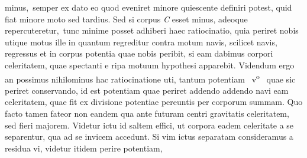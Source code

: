 %
\protect{}minus\lbrack,\rbrack\ semper ex
%
%
dato eo quod eveniret minore quiescente definiri potest, quid fiat
minore moto sed tardius. Sed si corpus \textit{C} esset minus, adeoque repercuteretur\lbrack,\rbrack\
tunc minime posset adhiberi haec ratiocinatio, quia periret nobis
utique motus ille in quantum regreditur contra motum navis, scilicet
%
%
navis,%
\protect{}
%
%
regressus 
%
%
et in corpus
%
%
%
potentia\protect{} quae
nobis peribit, si eam dabimus corpori
%
%
celeritatem, quae spectanti e %
ripa\protect{}
%
%
motuum hypothesi apparebit. Videndum ergo
an possimus nihilominus hac ratiocinatione uti, tantum %
potentiam\protect{}
%
%
~v\textsuperscript{o}\rbrack\
%
quae sic periret conservando, id est potentiam quae periret addendo
%
%
addendo navi eam 
celeritatem, quae fit ex divisione potentiae%
\protect{} pereuntis per corporum 
summam.%
\protect\index{Sachverzeichnis}{summa corporum} 
%
Quo facto tamen fateor non eandem qua ante futuram
centri gravitatis celeritatem,%
\protect{} sed fieri majorem. 
\pend \pstart
Videtur ictu%
\protect{} id saltem effici, ut corpora eadem celeritate a se
separentur, qua ad se invicem accedunt.
\pend \pstart
Si vim ictus%
\protect{} separatam consideramus a residua vi,%
\protect{} videtur itidem perire potentiam,%
